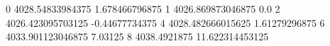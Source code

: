 0 4028.54833984375 1.678466796875
1 4026.869873046875 0.0
2 4026.423095703125 -0.44677734375
4 4028.482666015625 1.61279296875
6 4033.901123046875 7.03125
8 4038.4921875 11.622314453125
